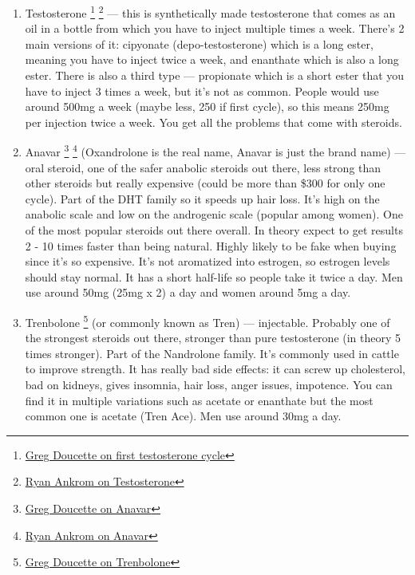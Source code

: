 \documentclass[openany, 12pt]{book}
\begin{document}
	\begin{enumerate}

		\item Testosterone
                  \footnote{\href{https://www.youtube.com/watch?v=SMaLWzRCmSA/}{Greg Doucette on first testosterone cycle}}
                  \footnote{\href{https://www.youtube.com/watch?v=kIkSrgsIDcY/}{Ryan Ankrom on Testosterone}}
                  --- this is synthetically made testosterone that comes as an oil in a bottle from which you have to inject multiple times a week. There's 2 main versions of it:
                  cipyonate (depo-testosterone) which is a long ester, meaning you have to inject twice a week, and enanthate which is also a long ester. There is also a third type --- propionate
                  which is a short ester that you have to inject 3 times a week, but it's not as common. People would use around 500mg a week (maybe less, 250 if first cycle), so this means 250mg per
                  injection twice a week. You get all the problems that come with steroids.
                    
		\item Anavar
                  \footnote{\href{https://www.youtube.com/watch?v=J4t4BeQaL8g}{Greg Doucette on Anavar}}
                  \footnote{\href{https://www.youtube.com/watch?v=9A2z7i9yP_4}{Ryan Ankrom on Anavar}}
                  (Oxandrolone is the real name, Anavar is just the brand name) --- oral steroid, one of the safer anabolic steroids out there, less strong than other steroids but really expensive
                  (could be more than \$300 for only one cycle). Part of the DHT family so it speeds up hair loss.
                  It's high on the anabolic scale and low on the androgenic scale (popular among women). One of the most popular steroids out there overall.
                  In theory expect to get results 2 - 10 times faster than being natural. Highly likely to be fake when buying since it's so expensive.
                  It's not aromatized into estrogen, so estrogen levels should stay normal.
                  It has a short half-life so people take it twice a day. Men use around 50mg (25mg x 2) a day and women around 5mg a day.

		\item Trenbolone
                  \footnote{\href{https://www.youtube.com/watch?v=tIvJh53jVfY/}{Greg Doucette on Trenbolone}}
                  (or commonly known as Tren) --- injectable. Probably one of the strongest steroids out there, stronger than pure testosterone (in theory 5 times stronger).
                  Part of the Nandrolone family. It's commonly used in cattle to improve strength.
                  It has really bad side effects: it can screw up cholesterol, bad on kidneys, gives insomnia, hair loss, anger issues, impotence. You can find it in multiple
                  variations such as acetate or enanthate but the most common one is acetate (Tren Ace). Men use around 30mg a day.


\end{enumerate}
\end{document}
